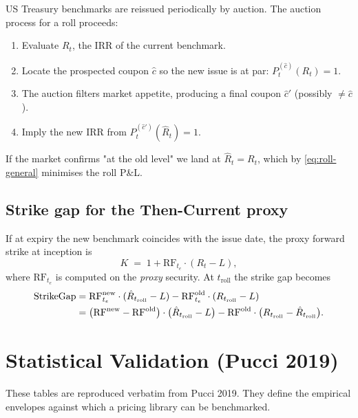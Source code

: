 \documentclass[11pt]{article}
\theoremstyle{definition}
\newcommand{\IRR}{\ensuremath{\mathrm{IRR}}}
\newcommand{\RF}{\ensuremath{\mathrm{RF}}}                 %
\begin{document}
US Treasury benchmarks are reissued periodically by auction. The
auction process for a roll proceeds:
\begin{enumerate}[leftmargin=1.6em,itemsep=1pt]
\item Evaluate $R_t$, the IRR of the current benchmark.
\item Locate the prospected coupon $\hat c$ so the new issue is at par:
      $P^{(\hat c)}_t(R_t) = 1$.
\item The auction filters market appetite, producing a final coupon
      $\hat c'$ (possibly $\ne \hat c$).
\item Imply the new $\IRR$ from $P^{(\hat c')}_t(\hat R_t) = 1$.
\end{enumerate}
If the market confirms "at the old level" we land at $\hat R_t = R_t$,
which by \cref{eq:roll-general} minimises the roll P\&L.

\subsection{Strike gap for the Then-Current proxy}

If at expiry the new benchmark coincides with the issue date, the
proxy forward strike at inception is
\begin{equation}
K \;=\; 1 + \RF_{t_e}\cdot(R_t - L),
\label{eq:K-then-current}
\end{equation}
where $\RF_{t_e}$ is computed on the \emph{proxy} security.
At $t_{\mathrm{roll}}$ the strike gap becomes
\begin{align}
\text{StrikeGap}
&= \RF^{\mathrm{new}}_{t_e}\cdot(\hat R_{t_{\mathrm{roll}}} - L)
 - \RF^{\mathrm{old}}_{t_e}\cdot(R_{t_{\mathrm{roll}}} - L) \notag\\
&= \bigl(\RF^{\mathrm{new}} - \RF^{\mathrm{old}}\bigr)\cdot
   \bigl(\hat R_{t_{\mathrm{roll}}} - L\bigr)
   - \RF^{\mathrm{old}}\cdot
   \bigl(R_{t_{\mathrm{roll}}} - \hat R_{t_{\mathrm{roll}}}\bigr).
\label{eq:strike-gap-tc}
\end{align}


\section{Statistical Validation (Pucci 2019)}\label{sec:stats}

These tables are reproduced verbatim from Pucci 2019. They define
the empirical envelopes against which a pricing library can be
benchmarked.
\end{document}
